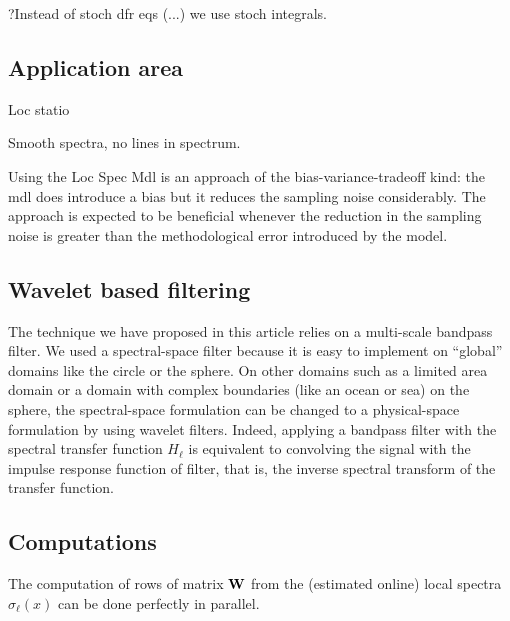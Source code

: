 \documentclass[12pt]{article}
\begin{document}
?Instead of stoch dfr eqs (...) we use stoch integrals.




\subsection{Application area}
\label{sec_discu_appl}



Loc statio

Smooth spectra, no lines in spectrum.

Using the Loc Spec Mdl is an approach of the bias-variance-tradeoff kind:
the mdl does introduce a bias but it reduces the sampling noise considerably. 
The approach is expected to be beneficial whenever the reduction in the sampling noise
is greater than the methodological error introduced by the model. 




\subsection{Wavelet based filtering}
\label{sec_discu_wvlf}


The technique we have proposed in this article  relies on a multi-scale bandpass filter.
We used a spectral-space filter because it is easy to implement on ``global'' domains like the circle
or the sphere. On other domains such as a limited area domain or a domain with
complex boundaries (like an ocean or sea)  on the sphere, the spectral-space  formulation
can be changed to a physical-space formulation by using wavelet filters.
Indeed, applying a bandpass filter with the spectral transfer function $H_\ell$ is equivalent to 
convolving the signal with the impulse response function of filter, that is, the inverse spectral 
transform of the transfer function.



\subsection{Computations}
\label{sec_discu_compu}



The computation of  rows of matrix ${\bf W}$ from the (estimated online) local spectra $\sigma_\ell(x)$ 
can be done perfectly in parallel.
\end{document}
